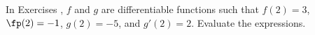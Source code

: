 {\noindent In Exercises}
{, $f$ and $g$ are differentiable functions such that $f(2)=3$, $\fp(2)=-1$, $g(2)=-5$, and $g'(2)=2$. Evaluate the expressions.
}
